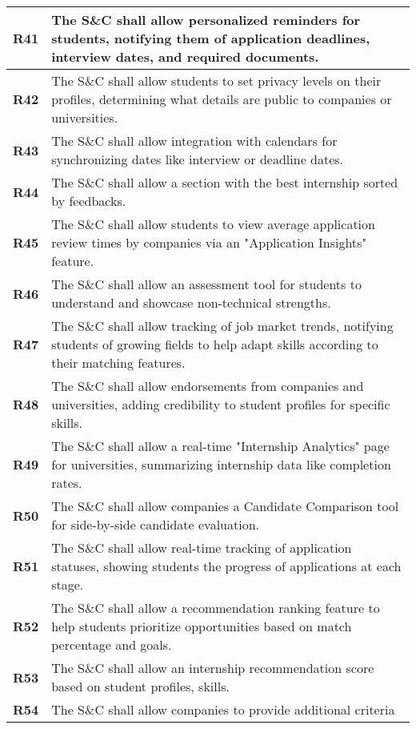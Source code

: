 \begin{longtable}{|p{}|p{}|}
\hline
\textbf{R41} & The S\&C shall allow personalized reminders for students, notifying them of application deadlines, interview dates, and required documents. \\ 
\hline
\textbf{R42} & The S\&C shall allow students to set privacy levels on their profiles, determining what details are public to companies or universities. \\  
\hline
\textbf{R43} & The S\&C shall allow integration with calendars for synchronizing dates like interview or deadline dates. \\ 
\hline
\textbf{R44} & The S\&C shall allow a section with the best internship sorted by feedbacks. \\ 
\hline
\textbf{R45} & The S\&C shall allow students to view average application review times by companies via an "Application Insights" feature. \\ 
\hline
\textbf{R46} & The S\&C shall allow an assessment tool for students to understand and showcase non-technical strengths. \\ 
\hline
\textbf{R47} & The S\&C shall allow tracking of job market trends, notifying students of growing fields to help adapt skills according to their matching features. \\ 
\hline
\textbf{R48} & The S\&C shall allow endorsements from companies and universities, adding credibility to student profiles for specific skills. \\ 
\hline
\textbf{R49} & The S\&C shall allow a real-time "Internship Analytics" page for universities, summarizing internship data like completion rates. \\ 
\hline
\textbf{R50} & The S\&C shall allow companies a Candidate Comparison tool for side-by-side candidate evaluation. \\ 
\hline
\textbf{R51} & The S\&C shall allow real-time tracking of application statuses, showing students the progress of applications at each stage. \\ 
\hline
\textbf{R52} & The S\&C shall allow a recommendation ranking feature to help students prioritize opportunities based on match percentage and goals. \\ 
\hline
\textbf{R53} & The S\&C shall allow an internship recommendation score based on student profiles, skills. \\ 
\hline
\textbf{R54} & The S\&C shall allow companies to provide additional criteria\\
\hline
\end{longtable}
\newpage
